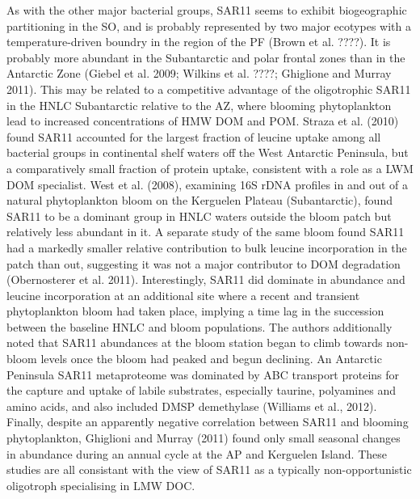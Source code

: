 As with the other major bacterial groups, SAR11 seems to exhibit biogeographic partitioning in the SO, and is probably represented by two major ecotypes with a temperature-driven boundry in the region of the PF (Brown et al. ????). It is probably more abundant in the Subantarctic and polar frontal zones than in the Antarctic Zone (Giebel et al. 2009; Wilkins et al. ????; Ghiglione and Murray 2011). This may be related to a competitive advantage of the oligotrophic SAR11 in the HNLC Subantarctic relative to the AZ, where blooming phytoplankton lead to increased concentrations of HMW DOM and POM. Straza et al. (2010) found SAR11 accounted for the largest fraction of leucine uptake among all bacterial groups in continental shelf waters off the West Antarctic Peninsula, but a comparatively small fraction of protein uptake, consistent with a role as a LWM DOM specialist. West et al. (2008), examining 16S rDNA profiles in and out of a natural phytoplankton bloom on the Kerguelen Plateau (Subantarctic), found SAR11 to be a dominant group in HNLC waters outside the bloom patch but relatively less abundant in it. A separate study of the same bloom found SAR11 had a markedly smaller relative contribution to bulk leucine incorporation in the patch than out, suggesting it was not a major contributor to DOM degradation (Obernosterer et al. 2011). Interestingly, SAR11 did dominate in abundance and leucine incorporation at an additional site where a recent and transient phytoplankton bloom had taken place, implying a time lag in the succession between the baseline HNLC and bloom populations. The authors additionally noted that SAR11 abundances at the bloom station began to climb towards non-bloom levels once the bloom had peaked and begun declining. An Antarctic Peninsula SAR11 metaproteome was dominated by ABC transport proteins for the capture and uptake of labile substrates, especially taurine, polyamines and amino acids, and also included DMSP demethylase (Williams et al., 2012). Finally, despite an apparently negative correlation between SAR11 and blooming phytoplankton, Ghiglioni and Murray (2011) found only small seasonal changes in abundance during an annual cycle at the AP and Kerguelen Island. These studies are all consistant with the view of SAR11 as a typically non-opportunistic oligotroph specialising in LMW DOC.

